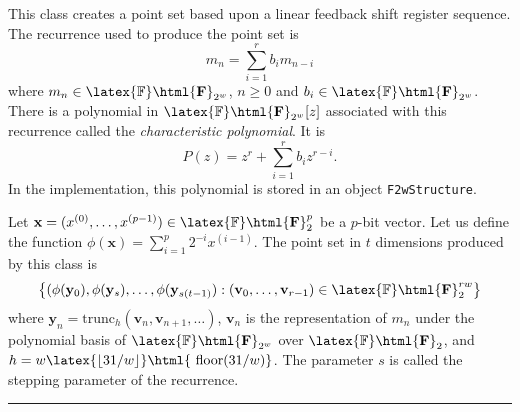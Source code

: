 
This class creates a point set based upon a linear feedback shift register
 sequence. The recurrence used to produce the point set is
$$
  m_n = \sum_{i=1}^r b_i m_{n-i}
$$
where $m_n\in \latex{\mathbb{F}}\html{\mathbf{F}}_{2^w}$, $n\geq 0$
  and $b_i\in \latex{\mathbb{F}}\html{\mathbf{F}}_{2^w}$.
There is a polynomial in $\latex{\mathbb{F}}\html{\mathbf{F}}_{2^w}[z]$
 associated with this recurrence called
the \emph{characteristic polynomial}.  It is
$$
  P(z) =  z^r + \sum_{i=1}^r b_i z^{r-i}.
$$
In the implementation, this polynomial is stored in an object
 \texttt{F2wStructure}.

Let ${\mathbf{x}} = (x^{(0)}, \ldots, x^{(p-1)}) \in
\latex{\mathbb{F}}\html{\mathbf{F}}_{2}^p$
be a $p$-bit vector.
Let us define the function $\phi(\mathbf{x}) = \sum_{i=1}^{p} 2^{-i} x^{(i-1)}$.
The point set in $t$ dimensions produced by this class is
$$
 \left\{ (\phi(\mathbf{y}_0),\phi(\mathbf{y}_s),\ldots,\phi(\mathbf{y}_{s(t-1)}):
  (\mathbf{v}_0,\ldots,\mathbf{v}_{r-1})\in
 \latex{\mathbb{F}}\html{\mathbf{F}}_{2}^{rw}\right\}
$$
where $\mathbf{y}_n = \mbox{trunc}_h(\mathbf{v}_n, \mathbf{v}_{n+1},\ldots)$,
$\mathbf{v}_n$ is the representation of $m_n$ under the polynomial basis of
$\latex{\mathbb{F}}\html{\mathbf{F}}_{2^w}$ over
 $\latex{\mathbb{F}}\html{\mathbf{F}}_2$, and
 $h=w\latex{\lfloor 31/w\rfloor}\html{\mbox{ floor}(31/w)}$.
The parameter $s$ is called the stepping parameter of the recurrence.

\bigskip\hrule\bigskip

